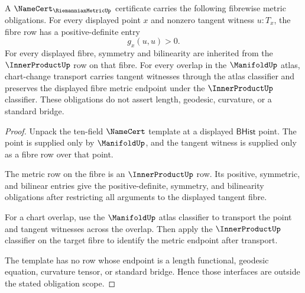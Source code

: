 \begin{theorem}
\label{thm:riemannianmetric-fibrewise-positive-compatibility-obligation}
A $\NameCert_{\RiemannianMetricUp}$ certificate carries the following
fibrewise metric obligations. For every displayed point $x$ and nonzero
tangent witness $u:T_x$, the fibre row has a positive-definite entry
$$
g_x(u,u)>0.
$$
For every displayed fibre, symmetry and bilinearity are inherited from the
$\InnerProductUp$ row on that fibre. For every overlap in the $\ManifoldUp$
atlas, chart-change transport carries tangent witnesses through the atlas
classifier and preserves the displayed fibre metric endpoint under the
$\InnerProductUp$ classifier. These obligations do not assert length,
geodesic, curvature, or a standard bridge.
\end{theorem}
\begin{proof}
Unpack the ten-field $\NameCert$ template at a displayed $\mathsf{BHist}$
point. The point is supplied only by $\ManifoldUp$, and the tangent witness is
supplied only as a fibre row over that point.

The metric row on the fibre is an $\InnerProductUp$ row. Its positive,
symmetric, and bilinear entries give the positive-definite, symmetry, and
bilinearity obligations after restricting all arguments to the displayed
tangent fibre.

For a chart overlap, use the $\ManifoldUp$ atlas classifier to transport the
point and tangent witnesses across the overlap. Then apply the
$\InnerProductUp$ classifier on the target fibre to identify the metric
endpoint after transport.

The template has no row whose endpoint is a length functional, geodesic
equation, curvature tensor, or standard bridge. Hence those interfaces are
outside the stated obligation scope.
\end{proof}

